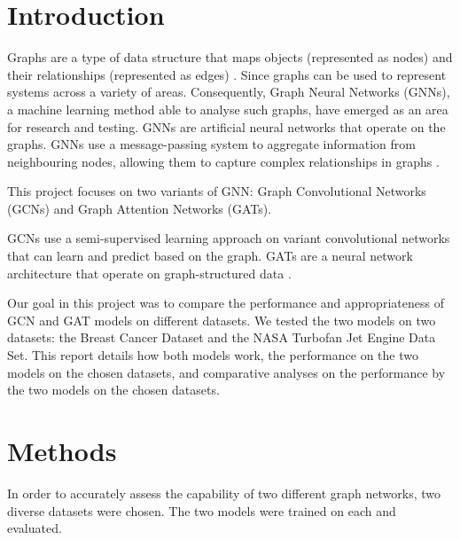 \documentclass[12pt]{article}
\begin{document}
\pagebreak
\renewcommand{\cftdotsep}{0.5}
\renewcommand{\cftsecleader}{\cftdotfill{\cftdotsep}}
\renewcommand{\contentsname}{Table of Contents}  %
\setlength{\cftbeforesecskip}{10pt}   %
\setlength{\cftbeforesubsecskip}{10pt} %
\setlength{\cftbeforesubsubsecskip}{10pt} %
\renewcommand{\cftsecpresnum}{Chapter~} %
\renewcommand{\cftsecaftersnum}{\quad} 
\setlength{\cftsecnumwidth}{6.1em}   %
\tableofcontents

\pagebreak
{}
\section{Introduction}

Graphs are a type of data structure that maps objects (represented as nodes) and their relationships (represented as edges) \cite{zhouGraphNeuralNetworks2020}. 
Since graphs can be used to represent systems across a variety of areas. Consequently, Graph Neural Networks (GNNs), a machine learning method able to analyse such graphs, have emerged as an area for research and testing. GNNs are artificial neural networks that operate on the graphs. 
GNNs use a message-passing system to aggregate information from neighbouring nodes, allowing them to capture complex relationships in graphs \cite{wuGraphNeuralNetworks2022}.

This project focuses on two variants of GNN: Graph Convolutional Networks (GCNs) and Graph Attention Networks (GATs).

GCNs use a semi-supervised learning approach on variant convolutional networks that can learn and predict based on the graph. GATs are a neural network architecture that operate on graph-structured data \cite{nobleWhatGraphNeural2025}.

Our goal in this project was to compare the performance and appropriateness of GCN and GAT models on different datasets. We tested the two models on two datasets: the Breast Cancer Dataset and the NASA Turbofan Jet Engine Data Set. This report details how both models work, the performance on the two models on the chosen datasets, and comparative analyses on the performance by the two models on the chosen datasets.


\pagebreak
\section{Methods}
In order to accurately assess the capability of two different graph networks, two diverse datasets were chosen. The two models were trained on each and evaluated.
\end{document}
